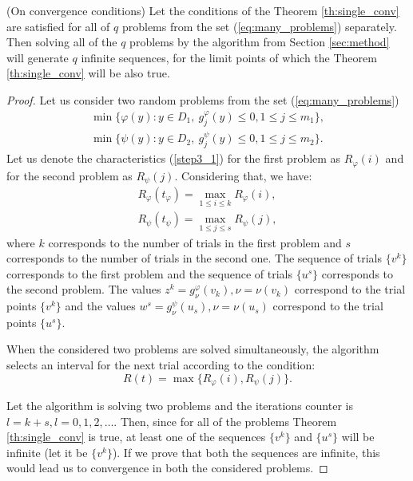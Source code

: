 \documentclass[runningheads]{llncs}
\begin{document}
\begin{theorem} (On convergence conditions) Let the conditions of the Theorem \ref{th:single_conv}
  are satisfied for all of \(q\) problems from the set (\ref{eq:many_problems}) separately.
  Then solving all of the \(q\) problems by the algorithm from Section \ref{sec:method} will
  generate \(q\) infinite sequences, for the limit points of which the Theorem \ref{th:single_conv}
  will be also true.
\end{theorem}
\begin{proof}
  Let us consider two random problems from the set (\ref{eq:many_problems})
  \begin{equation}
      \begin{array}{lr}
        \min\{\varphi(y):y\in D_1,\: g_j^\varphi(y)\leqslant 0, 1\leqslant j\leqslant m_1\}, \\
        \min\{\psi(y):y\in D_2,\: g_j^\psi(y)\leqslant 0, 1\leqslant j\leqslant m_2\}.
      \end{array}
  \end{equation}
  Let us denote the characteristics (\ref{step3_1}) for the first problem as \(R_\varphi(i)\)
  and for the second problem as \(R_\psi(j)\). Considering that, we have:
  \begin{equation}
      \begin{array}{lr}
        R_\varphi(t_\varphi)=\max_{1\leqslant i\leqslant k}R_\varphi(i), \\
        R_\psi(t_\psi)=\max_{1\leqslant j\leqslant s}R_\psi(j),
      \end{array}
  \end{equation}
  where \(k\) corresponds to the number of trials in the first problem and \(s\)
  corresponds to the number of trials in the second one. The sequence of trials \(\{v^k\}\)
  corresponds to the first problem and the sequence of trials \(\{u^s\}\)
  corresponds to the second problem. The values \(z^k=g^\varphi_\nu(v_k),\nu =\nu (v_{k})\) correspond to the
  trial points \(\{v^k\}\) and the values \(w^s=g^\psi_\nu(u_s),\nu =\nu(u_{s})\) correspond to the
  trial points \(\{u^s\}\).

  When the considered two problems are solved simultaneously, the algorithm selects
  an interval for the next trial according to the condition:
  \begin{equation}
    R(t) = \max\{R_\varphi(i),R_\psi(j)\}.
  \end{equation}

  Let the algorithm is solving two problems and the iterations counter is \(l = k + s, l=0,1,2,\dots\).
  Then, since for all of the problems Theorem \ref{th:single_conv} is true, at least one of the sequences
  \(\{v^k\}\) and \(\{u^s\}\) will be infinite (let it be \(\{v^k\}\)). If we prove that both the
  sequences are infinite, this would lead us to convergence in both the considered problems.


\end{proof}
\end{document}
